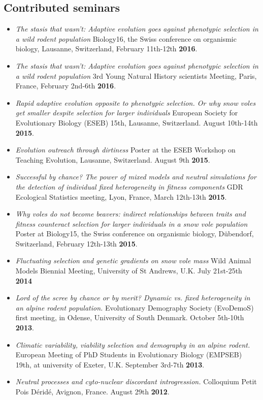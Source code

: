 \documentclass[a4paper,10pt]{article} %
\begin{document}
\subsection*{Contributed seminars}
\begin{itemize}
\item \textit{The stasis that wasn't: Adaptive evolution goes against phenotypic selection in a wild rodent population} Biology16, the Swiss conference on organismic biology, Lausanne, Switzerland, February 11th-12th \textbf{2016}.
\item \textit{The stasis that wasn't: Adaptive evolution goes against phenotypic selection in a wild rodent population} 3rd Young Natural History scientists Meeting, Paris, France, February 2nd-6th \textbf{2016}.
\item \textit{Rapid adaptive evolution opposite to phenotypic selection. Or why snow voles get smaller despite selection for larger individuals} European Society for Evolutionary Biology (ESEB) 15th, Lausanne, Switzerland. August 10th-14th \textbf{2015}.
\item \textit{Evolution outreach through dirtiness} Poster at the ESEB Workshop on Teaching Evolution, Lausanne, Switzerland. August 9th \textbf{2015}.
\item \textit{Successful by chance? The power of mixed models and neutral simulations for the detection of individual fixed heterogeneity in fitness components} GDR Ecological Statistics meeting, Lyon, France, March 12th-13th \textbf{2015}.
\item \textit{Why voles do not become beavers: indirect relationships between traits and fitness counteract selection for larger individuals in a snow vole population} Poster at Biology15, the Swiss conference on organismic biology, D\"{u}bendorf, Switzerland, February 12th-13th \textbf{2015}.
\item \textit{Fluctuating selection and genetic gradients on snow vole mass} Wild Animal Models Biennial Meeting, University of St Andrews, U.K. July 21st-25th \textbf{2014}
\item \textit{Lord of the scree by chance or by merit? Dynamic vs. fixed heterogeneity in an alpine rodent population.} Evolutionary Demography Society (EvoDemoS) first meeting, in Odense, University of South Denmark. October 5th-10th \textbf{2013}.
\item \textit{Climatic variability, viability selection and demography in an alpine rodent.} European Meeting of PhD Students in Evolutionary Biology (EMPSEB) 19th, at university of Exeter, U.K. September 3rd-7th \textbf{2013}.
\item \textit{Neutral processes and cyto-nuclear discordant introgression.} Colloquium Petit Pois D\'{e}rid\'{e}, Avignon, France. August 29th \textbf{2012}.
\end{itemize}
\end{document}
